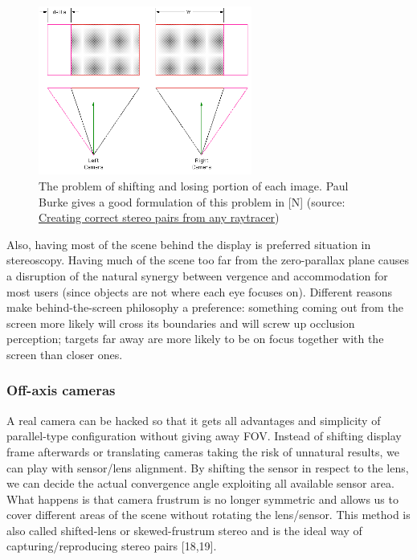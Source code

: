 \begin{figure}
\centering
\includegraphics[width=7cm]{schemas/parallel}
\caption{The problem of shifting and losing portion of each image. Paul Burke gives a good formulation of this problem in [N] (source: \href{http://klee.cittastudi.di.unimi.it/~dan/PGL/doc/articoli&libri/CalculatingStereoPairs.pdf} {Creating correct stereo pairs from any raytracer})}
\label{fig:parallel_cameras}
\end{figure}

Also, having most of the scene behind the display is preferred situation in stereoscopy. Having much of the scene too far from the zero-parallax plane causes a disruption of the natural synergy between vergence and accommodation for most users (since objects are not where each eye focuses on). Different reasons make behind-the-screen philosophy a preference: something coming out from the screen more likely will cross its boundaries and will screw up occlusion perception; targets far away are more likely to be on focus together with the screen than closer ones.

\subsubsection{Off-axis cameras}
A real camera can be hacked so that it gets all advantages and simplicity of parallel-type configuration without giving away FOV. Instead of shifting display frame afterwards or translating cameras taking the risk of unnatural results, we can play with sensor/lens alignment. By shifting the sensor in respect to the lens, we can decide the actual convergence angle exploiting all available sensor area. What happens is that camera frustrum is no longer symmetric and allows us to cover different areas of the scene without rotating the lens/sensor. This method is also called shifted-lens or skewed-frustrum stereo and is the ideal way of capturing/reproducing stereo pairs [18,19].

